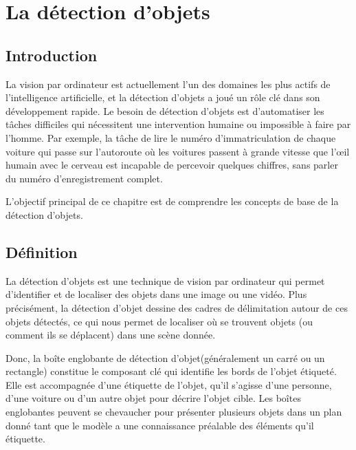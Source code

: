  \chapter{La détection d'objets}
\minitoc
\newpage
\pagestyle{fancy}
\fancyhead[L]{\chaptername \ \thechapter}
\renewcommand{\headrulewidth}{1pt}
\fancyfoot[C]{\thepage}

\section{Introduction} 
La vision par ordinateur est actuellement l'un des domaines les plus actifs de l'intelligence artificielle, et la détection d'objets a joué un rôle clé dans son développement rapide. 
Le besoin de détection d'objets est d'automatiser les tâches difficiles qui nécessitent une intervention humaine ou impossible à faire par l'homme. Par exemple, la tâche de lire le numéro d'immatriculation de chaque voiture qui passe sur l'autoroute où les voitures passent à grande vitesse que l'œil humain avec le cerveau est incapable de percevoir quelques chiffres, sans parler du numéro d'enregistrement complet.

L'objectif principal de ce chapitre est de comprendre les concepts de base de la détection d'objets.

\section{Définition}
La détection d'objets est une technique de vision par ordinateur qui permet d'identifier et de localiser des objets dans une image ou une vidéo. Plus précisément, la détection d'objet dessine des cadres de délimitation autour de ces objets détectés, ce qui nous permet de localiser où se trouvent  objets (ou comment ils se déplacent) dans une scène donnée. 

Donc,  la boîte englobante de détection d'objet(généralement un carré ou un rectangle) constitue le composant clé  qui identifie les bords de l'objet étiqueté. Elle est accompagnée d'une étiquette de l'objet, qu'il s'agisse d'une personne, d'une voiture ou d'un autre objet pour décrire l'objet cible. Les boîtes englobantes peuvent se chevaucher pour présenter plusieurs objets dans un plan donné tant que le modèle a une connaissance préalable des éléments qu'il étiquette.

